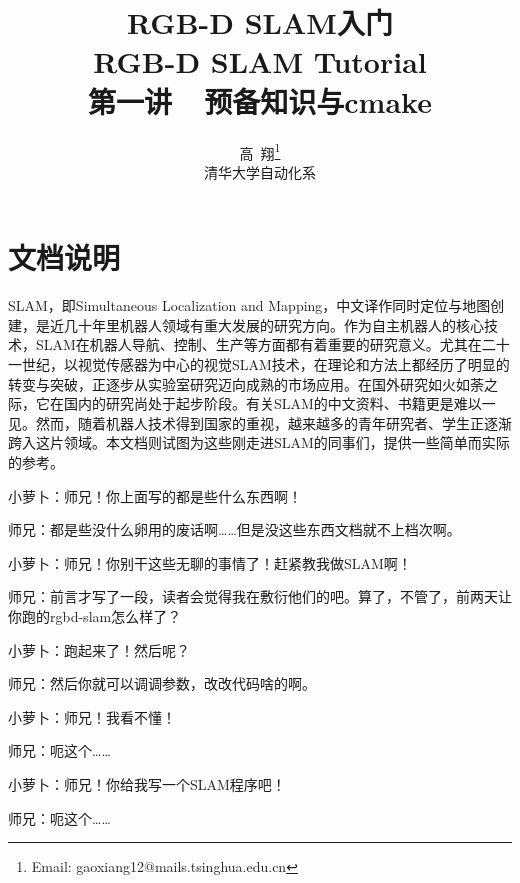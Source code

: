 \documentclass[9pt,a4paper]{article}
\begin{document}
	
\renewcommand{\contentsname}{目录}  %
\renewcommand{\abstractname}{摘要}  %
\renewcommand{\refname}{参考文献}   %
\renewcommand{\indexname}{索引}
\renewcommand{\figurename}{图}
\renewcommand{\tablename}{表}
\renewcommand{\appendixname}{附录}
	
	
\title{RGB-D SLAM入门 \\ RGB-D SLAM Tutorial \\
	第一讲~~预备知识与cmake}
\author{高~翔\footnote{Email: gaoxiang12@mails.tsinghua.edu.cn}\\[2ex]
	 清华大学自动化系\\[2ex]
}
\maketitle

\section{文档说明}
SLAM，即Simultaneous Localization and Mapping，中文译作同时定位与地图创建，是近几十年里机器人领域有重大发展的研究方向。作为自主机器人的核心技术，SLAM在机器人导航、控制、生产等方面都有着重要的研究意义。尤其在二十一世纪，以视觉传感器为中心的视觉SLAM技术，在理论和方法上都经历了明显的转变与突破，正逐步从实验室研究迈向成熟的市场应用。在国外研究如火如荼之际，它在国内的研究尚处于起步阶段。有关SLAM的中文资料、书籍更是难以一见。然而，随着机器人技术得到国家的重视，越来越多的青年研究者、学生正逐渐跨入这片领域。本文档则试图为这些刚走进SLAM的同事们，提供一些简单而实际的参考。

小萝卜：师兄！你上面写的都是些什么东西啊！

师兄：都是些没什么卵用的废话啊……但是没这些东西文档就不上档次啊。

小萝卜：师兄！你别干这些无聊的事情了！赶紧教我做SLAM啊！

师兄：前言才写了一段，读者会觉得我在敷衍他们的吧。算了，不管了，前两天让你跑的rgbd-slam怎么样了？

小萝卜：跑起来了！然后呢？

师兄：然后你就可以调调参数，改改代码啥的啊。

小萝卜：师兄！我看不懂！

师兄：呃这个……

小萝卜：师兄！你给我写一个SLAM程序吧！

师兄：呃这个……
\end{document}
